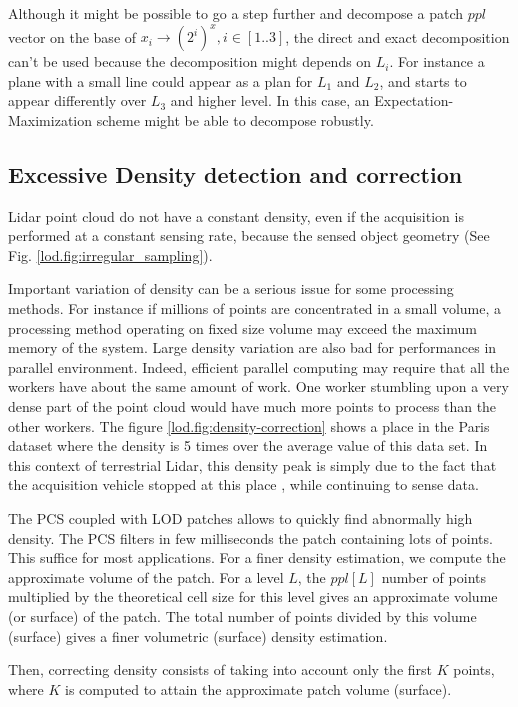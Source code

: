 		Although it might be possible to go a step further and decompose a patch $ppl$ vector on the base of $x_i \rightarrow (2^i)^x, i \in [1..3]$, the direct and exact decomposition can't be used because the decomposition might depends on $L_i$. For instance a plane with a small line could appear as a plan for $L_1$ and $L_2$, and starts to appear differently over $L_3$ and higher level. In this case, an Expectation-Maximization scheme might be able to decompose robustly.
 
	\subsection{Excessive Density detection and correction}
		\label{lod.method.density}
		Lidar point cloud do not have a constant density, even if the acquisition is performed at a constant sensing rate, because the sensed object geometry (See Fig. \ref{lod.fig:irregular_sampling}).
		
		Important variation of density can be a serious issue for some processing methods. 
		For instance if millions of points are concentrated in a small volume,
		a processing method operating on fixed size volume may exceed the maximum memory of the system.
		Large density variation are also bad for performances in parallel environment.
		Indeed, efficient parallel computing may require that all the workers have about the same amount of work.
		One worker stumbling upon a very dense part of the point cloud would have much more points to process than the other workers.
		The figure \ref{lod.fig:density-correction} shows a place in the Paris dataset where the density is 5 times over the average value of this data set.
		In this context of terrestrial Lidar, this density peak is simply due to the fact that the acquisition vehicle stopped at this place
		, while continuing to sense data.
		
		The PCS coupled with LOD patches allows to quickly find abnormally high density.
		The PCS filters in few milliseconds the patch containing lots of points. This suffice for most applications.
		For a finer density estimation, we compute the approximate volume of the patch.
		For a level $L$, the $ppl[L]$ number of points multiplied by the theoretical cell size for this level gives an approximate volume (or surface) of the patch.
		The total number of points divided by this volume (surface) gives a finer volumetric (surface) density estimation.
		
		Then, correcting density consists of taking into account only the first $K$ points, where $K$ is computed to attain the approximate patch volume (surface).
		
